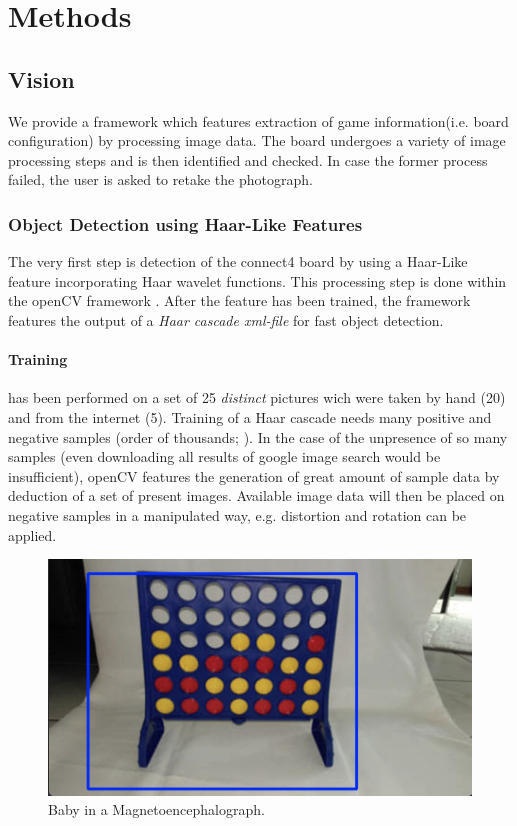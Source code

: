 \documentclass[10pt,twocolumn,letterpaper]{article}
\begin{document}
\section{Methods}

\subsection{Vision}
We provide a framework which features extraction of game information(i.e. board configuration) by processing image data.
The board undergoes a variety of image processing steps and is then identified and checked.
In case the former process failed, the user is asked to retake the photograph.

\subsubsection{Object Detection using Haar-Like Features}
The very first step is detection of the connect4 board by using a Haar-Like feature incorporating Haar wavelet functions.
This processing step is done within the openCV framework \parencite{openCV}.
After the feature has been trained, the framework features the output of a \textit{Haar cascade xml-file} for fast object detection.

\paragraph{Training} has been performed on a set of 25 \textit{distinct} pictures wich were taken by hand (20) and from the internet (5).
Training of a Haar cascade needs many positive and negative samples (order of thousands;  \cite{kuranov}).
In the case of the unpresence of so many samples (even downloading all results of google image search would be insufficient), openCV features the generation of great amount of sample data by deduction of a set of present images.
Available image data will then be placed on negative samples in a manipulated way, e.g. distortion and rotation can be applied.
\begin{figure}[!bh]
  \centering
  \includegraphics[width = .3\textwidth]{figures/detection.png}
  \caption{Baby in a Magnetoencephalograph. \parencite{babyMEG}}
  \label{fig:meg}
\end{figure}
\end{document}
